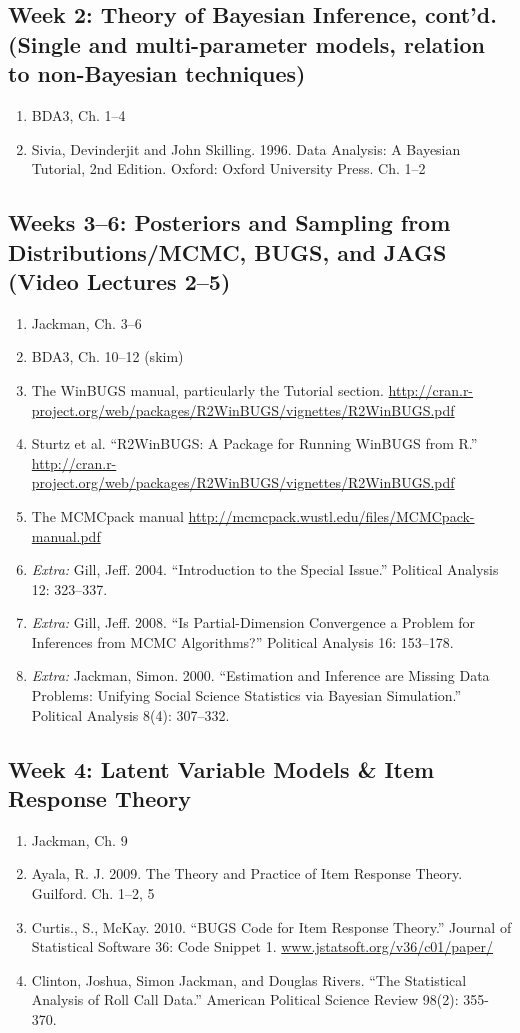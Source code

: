 \documentclass[11pt, leqno, fleqn]{article}
\begin{document}
\subsection*{Week 2: Theory of Bayesian Inference, cont'd. (Single and multi-parameter models, relation to non-Bayesian techniques)}
	\begin{enumerate}
	\item[] BDA3, Ch. 1--4
	\item[] Sivia, Devinderjit and John Skilling. 1996. Data Analysis: A Bayesian Tutorial, 2nd Edition. Oxford: Oxford University Press. Ch. 1--2
	\end{enumerate}
\subsection*{Weeks 3--6: Posteriors and Sampling from Distributions/MCMC, BUGS, and JAGS (Video Lectures 2--5)} 
	\begin{enumerate}
	\item[] Jackman, Ch. 3--6
	\item[] BDA3, Ch. 10--12 (skim)
	\item[] The WinBUGS manual, particularly the Tutorial section. \url{http://cran.r-
project.org/web/packages/R2WinBUGS/vignettes/R2WinBUGS.pdf}
	\item[] Sturtz et al. ``R2WinBUGS: A Package for Running WinBUGS from R.'' \url{http://cran.r-project.org/web/packages/R2WinBUGS/vignettes/R2WinBUGS.pdf}
	\item[] The MCMCpack manual \url{http://mcmcpack.wustl.edu/files/MCMCpack-manual.pdf}
	\item[] {\em Extra:} Gill, Jeff. 2004. ``Introduction to the Special Issue.'' Political Analysis 12: 323--337.
	\item[] {\em Extra:} Gill, Jeff. 2008. ``Is Partial-Dimension Convergence a Problem for Inferences from MCMC Algorithms?'' Political Analysis 16: 153--178.
	\item[] {\em Extra:} Jackman, Simon. 2000. ``Estimation and Inference are Missing Data Problems: Unifying Social Science Statistics via Bayesian Simulation.'' Political Analysis 8(4): 307--332.
	\end{enumerate}
\subsection*{Week 4: Latent Variable Models \& Item Response Theory}
	\begin{enumerate}
	\item[] Jackman, Ch. 9
	\item[] Ayala, R. J. 2009. The Theory and Practice of Item Response Theory. Guilford. Ch. 1--2, 5
	\item[] Curtis., S., McKay. 2010. ``BUGS Code for Item Response Theory.'' Journal of
Statistical Software 36: Code Snippet 1. \url{
www.jstatsoft.org/v36/c01/paper/}
	\item[] Clinton, Joshua, Simon Jackman, and Douglas Rivers. ``The Statistical Analysis
of Roll Call Data.'' American Political Science Review 98(2): 355-370.
	\end{enumerate}
\end{document}
